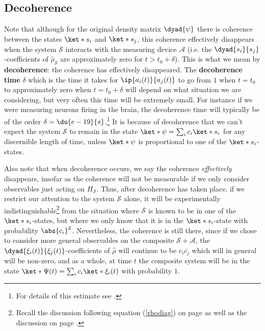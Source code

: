 \documentclass[12pt]{report}
\begin{document}
    \subsection{Decoherence}
    Note that although for the original density matrix $\dyad{\psi}$ there is coherence between the states $\ket*{s_i}$ and $\ket*{s_j}$, this coherence effectively  disappears when the system $\mathcal{S}$ interacts with the measuring device $\mathcal{A}$ (i.e. the $\dyad{s_i}{s_j}$-coefficients of $\hat{\rho}_\mathcal{S}$ are approximately zero for $t> t_0+\delta$). This is what we mean by \textbf{decoherence}: the coherence has effectively disappeared. The \textbf{decoherence time} $\delta$ which is the time it takes for $\ip{a_i(t)}{a_j(t)}$ to go from $1$ when $t=t_0$ to approximately zero when $t=t_0+\delta$ will depend on what situation we are considering, but very often this time will be extremely small. For instance if we were measuring neurons firing in the brain, the decoherence time will typically be of the order $\delta =\du{e-19}{s}$.\footnote{For details of this estimate see \cite[370]{Schlosshauer}.} It is because of decoherence that we can't expect the system $\mathcal{S}$ to remain in the state $\ket*{\psi}=\sum_i c_i\ket*{s_i}$ for any discernible length of time, unless $\ket*{\psi}$ is proportional to one of the $\ket*{s_i}$-states.  
    
    Also note that when decoherence occurs, we say the coherence \emph{effectively} disappears, insofar as the coherence will not be measurable if we only consider observables just acting on $H_\mathcal{S}$. Thus, after decoherence has taken place, if we restrict our attention to the system $\mathcal{S}$ alone, it will be experimentally indistinguishable\footnote{Recall the discussion following equation (\ref{rhodiag}) on page \pageref{rhodiag} as well as the discussion on page \pageref{subtle}.} from the situation where $\mathcal{S}$ is known to be in one of the $\ket*{s_i}$-states, but where we only know that it is in the $\ket*{s_i}$-state with probability $\abs{c_i}^2$. Nevertheless, the coherence is still there, since if we chose to consider more general observables on the composite $\mathcal{S}+\mathcal{A}$, the $\dyad{\xi_i(t)}{\xi_j(t)}$-coefficients of $\hat{\rho}$ will continue to be $c_i\overline{c_j}$ which will in general will be non-zero, and as a whole, at time $t$ the composite system will be in the state $\ket*{\Psi(t)}=\sum_i c_i\ket*{\xi_i(t)}$ with probability $1$.
    
\end{document}
